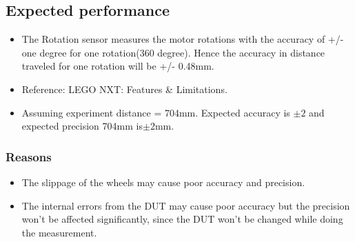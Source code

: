 \documentclass[11pt,a4paper]{article}
\begin{document}
\subsection{\textbf{Expected performance}}
\begin{itemize}
\item The Rotation sensor measures the motor rotations with the accuracy of +/- one degree for one rotation(360 degree). Hence the accuracy in distance traveled for one rotation will be +/- 0.48mm. 
\item Reference: LEGO NXT: Features \& Limitations.
\item Assuming experiment distance = 704mm. Expected accuracy is $ \pm 2$ and expected precision 704mm is$ \pm 2$mm.
\end{itemize}

\subsubsection{Reasons}
\begin{itemize}
\item The slippage of the wheels may cause poor accuracy and precision.
\item The internal errors from the DUT may cause poor accuracy but the precision won't be affected significantly, since the DUT won't be changed while doing the measurement.
\end{itemize}
\end{document}
